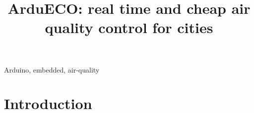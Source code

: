 \documentclass[conference]{IEEEtran}
\begin{document}
\title{ArduECO: real time and cheap air quality control for cities}

\author{
}

\maketitle

\begin{abstract}
	\lipsum[2-4]
\end{abstract}

\vspace{.2cm}

\begin{IEEEkeywords}
Arduino, embedded, air-quality
\end{IEEEkeywords}

\section{Introduction}
\end{document}
